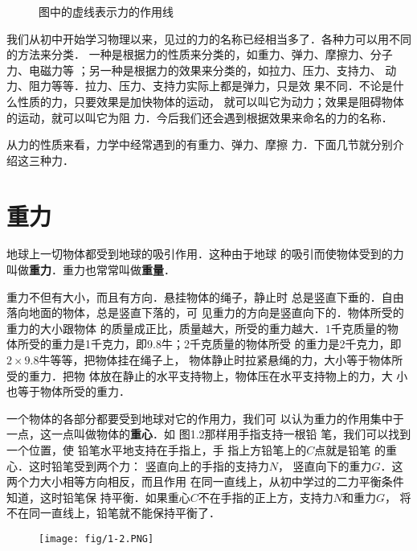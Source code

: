 \begin{figure}[htp]\centering
{}
\caption{图中的虚线表示力的作用线}
\end{figure}

我们从初中开始学习物理以来，见过的力的名称已经相当多了．各种力可以用不同的方法来分类．
一种是根据力的性质来分类的，如重力、弹力、摩擦力、分子力、电磁力等
；另一种是根据力的效果来分类的，如拉力、压力、支持力、
动力、阻力等等．拉力、压力、支持力实际上都是弹力，只是效
果不同．不论是什么性质的力，只要效果是加快物体的运动，
就可以叫它为动力；效果是阻碍物体的运动，就可以叫它为阻
力．今后我们还会遇到根据效果来命名的力的名称．

    从力的性质来看，力学中经常遇到的有重力、弹力、摩擦
力．下面几节就分别介绍这三种力．


\section{重力}
    地球上一切物体都受到地球的吸引作用．这种由于地球
的吸引而使物体受到的力叫做\textbf{重力}．重力也常常叫做\textbf{重量}．

    重力不但有大小，而且有方向．悬挂物体的绳子，静止时
总是竖直下垂的．自由落向地面的物体，总是竖直下落的，可
见重力的方向是竖直向下的．物体所受的重力的大小跟物体
的质量成正比，质量越大，所受的重力越大．1千克质量的物
体所受的重力是1千克力，即9.8牛；2千克质量的物体所受
的重力是2千克力，即$2\times 9.8$牛等等，把物体挂在绳子上，
物体静止时拉紧悬绳的力，大小等于物体所受的重力．把物
体放在静止的水平支持物上，物体压在水平支持物上的力，大
小也等于物体所受的重力．

    一个物体的各部分都要受到地球对它的作用力，我们可
以认为重力的作用集中于一点，这一点叫做物体的\textbf{重心}．如
图1.2那样用手指支持一根铅
笔，我们可以找到一个位置，使
铅笔水平地支持在手指上，手
指上方铅笔上的$C$点就是铅笔
的重心．这时铅笔受到两个力：
竖直向上的手指的支持力$N$，
竖直向下的重力$G$．这两个力大小相等方向相反，而且作用
在同一直线上，从初中学过的二力平衡条件知道，这时铅笔保
持平衡．如果重心$C$不在手指的正上方，支持力$N$和重力$G$，
将不在同一直线上，铅笔就不能保持平衡了．
\begin{figure}[htp]
\centering
\texttt{[image: fig/1-2.PNG]}
\caption{}
\end{figure}

